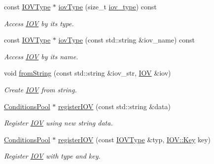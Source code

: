 \begin{DoxyCompactItemize}
const \hyperlink{class_d_d4hep_1_1_i_o_v_type}{I\+O\+V\+Type} $\ast$ \hyperlink{class_d_d4hep_1_1_conditions_1_1_conditions_manager_object_a5dd9771697550f7f82d47863026d4bd5}{iov\+Type} (size\+\_\+t \hyperlink{class_d_d4hep_1_1_conditions_1_1_conditions_manager_object_a0190ec510ca46da4a1cc908ac3c3a1dd}{iov\+\_\+type}) const
\begin{DoxyCompactList}\small\item\em Access \hyperlink{class_d_d4hep_1_1_i_o_v}{I\+OV} by its type. \end{DoxyCompactList}\item 
const \hyperlink{class_d_d4hep_1_1_i_o_v_type}{I\+O\+V\+Type} $\ast$ \hyperlink{class_d_d4hep_1_1_conditions_1_1_conditions_manager_object_a52c243546411e3e5d23c366fb7633286}{iov\+Type} (const std\+::string \&iov\+\_\+name) const
\begin{DoxyCompactList}\small\item\em Access \hyperlink{class_d_d4hep_1_1_i_o_v}{I\+OV} by its name. \end{DoxyCompactList}\item 
void \hyperlink{class_d_d4hep_1_1_conditions_1_1_conditions_manager_object_a9ff0d68cbe3771a7a9354bdf518ddd11}{from\+String} (const std\+::string \&iov\+\_\+str, \hyperlink{class_d_d4hep_1_1_i_o_v}{I\+OV} \&iov)
\begin{DoxyCompactList}\small\item\em Create \hyperlink{class_d_d4hep_1_1_i_o_v}{I\+OV} from string. \end{DoxyCompactList}\item 
\hyperlink{class_d_d4hep_1_1_conditions_1_1_conditions_pool}{Conditions\+Pool} $\ast$ \hyperlink{class_d_d4hep_1_1_conditions_1_1_conditions_manager_object_a5843d64a9285d2f40f636e6d91020bf0}{register\+I\+OV} (const std\+::string \&data)
\begin{DoxyCompactList}\small\item\em Register \hyperlink{class_d_d4hep_1_1_i_o_v}{I\+OV} using new string data. \end{DoxyCompactList}\item 
\hyperlink{class_d_d4hep_1_1_conditions_1_1_conditions_pool}{Conditions\+Pool} $\ast$ \hyperlink{class_d_d4hep_1_1_conditions_1_1_conditions_manager_object_ac6647d16096a5fccda601eada638e13b}{register\+I\+OV} (const \hyperlink{class_d_d4hep_1_1_i_o_v_type}{I\+O\+V\+Type} \&typ, \hyperlink{class_d_d4hep_1_1_i_o_v_a07cb46dc875296dc9cccf4ff370104ae}{I\+O\+V\+::\+Key} key)
\begin{DoxyCompactList}\small\item\em Register \hyperlink{class_d_d4hep_1_1_i_o_v}{I\+OV} with type and key. \end{DoxyCompactList}\item 

\end{DoxyCompactItemize}
